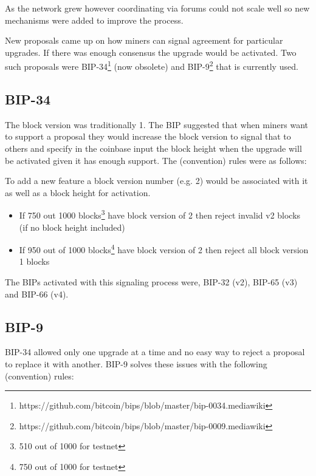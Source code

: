 As the network grew however coordinating via forums could not scale well so new mechanisms were added to improve the process.

New proposals came up on how miners can signal agreement for particular upgrades. If there was enough consensus the upgrade would be activated. Two such proposals were BIP-34\footnote{https://github.com/bitcoin/bips/blob/master/bip-0034.mediawiki} (now obsolete) and BIP-9\footnote{https://github.com/bitcoin/bips/blob/master/bip-0009.mediawiki} that is currently used.

\subsection*{BIP-34}
The block version was traditionally 1. The BIP suggested that when miners want to support a proposal they would increase the block version to signal that to others and specify in the coinbase input the block height when the upgrade will be activated given it has enough support. The (convention) rules were as follows:

To add a new feature a block version number (e.g. 2) would be associated with it as well as a block height for activation.

\begin{itemize}
\item If 750 out 1000 blocks\footnote{510 out of 1000 for testnet} have block version of 2 then reject invalid v2 blocks (if no block height included)
\item If 950 out of 1000 blocks\footnote{750 out of 1000 for testnet} have block version of 2 then reject all block version 1 blocks
\end{itemize}

The BIPs activated with this signaling process were, BIP-32 (v2), BIP-65 (v3) and BIP-66 (v4).


\subsection*{BIP-9}
BIP-34 allowed only one upgrade at a time and no easy way to reject a proposal to replace it with another. BIP-9 solves these issues with the following (convention) rules:

